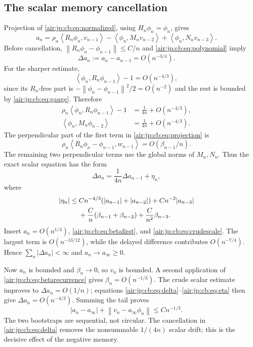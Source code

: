 \documentclass[11pt,letterpaper]{article}
\numberwithin{equation}{section}
\theoremstyle{remark}
\newcommand{\norm}[1]{\left\lVert#1\right\rVert}
\newcommand{\ip}[2]{\left\langle#1,#2\right\rangle}
\begin{document}
\subsection{The scalar memory cancellation}
Projection of \eqref{air:jp:cb:eq:normalized}, using $H_n\phi_n=\phi_n$, gives
\begin{equation}\label{air:jp:cb:eq:projection}
 a_n=\rho_n\ip{R_n\phi_n}{v_{n-1}}
       -\ip{\phi_n}{M_nv_{n-2}}+\ip{\phi_n}{N_nv_{n-3}}.
\end{equation}
Before cancellation, $\norm{R_n\phi_n-\phi_{n-1}}\le C/n$ and \eqref{air:jp:cb:eq:polynomial} imply
\begin{equation}\label{air:jp:cb:eq:crudescale}
 \Delta a_n:=a_n-a_{n-1}=O(n^{-3/4}).
\end{equation}
For the sharper estimate,
\[
 \ip{\phi_n}{R_n\phi_{n-1}}-1=O(n^{-4/3}),
\]
since its $R_n$-free part is $-\norm{\phi_n-\phi_{n-1}}^2/2=O(n^{-2})$ and the rest is bounded by \eqref{air:jp:cb:eq:gauge}. Therefore
\begin{align*}
 \rho_n\ip{\phi_n}{R_n\phi_{n-1}}-1&=\frac1{4n}+O(n^{-4/3}),\\
 \ip{\phi_n}{M_n\phi_{n-2}}&=\frac1{4n}+O(n^{-4/3}).
\end{align*}
The perpendicular part of the first term in \eqref{air:jp:cb:eq:projection} is
\[
 \rho_n\ip{R_n\phi_n-\phi_{n-1}}{w_{n-1}}=O(\beta_{n-1}/n).
\]
The remaining two perpendicular terms use the global norms of $M_n,N_n$. Thus the exact scalar equation has the form
\begin{equation}\label{air:jp:cb:eq:delta}
 \Delta a_n=\frac1{4n}\Delta a_{n-1}+\eta_n,
\end{equation}
where
\begin{align}
 |\eta_n|\le{}&Cn^{-4/3}(|a_{n-1}|+|a_{n-2}|)+Cn^{-2}|a_{n-3}|\notag\\
 &+\frac Cn(\beta_{n-1}+\beta_{n-2})+\frac C{n^2}\beta_{n-3}.\label{air:jp:cb:eq:eta}
\end{align}
Insert $a_n=O(n^{1/4})$, \eqref{air:jp:cb:eq:betafirst}, and \eqref{air:jp:cb:eq:crudescale}. The largest term is $O(n^{-13/12})$, while the delayed difference contributes $O(n^{-7/4})$. Hence $\sum_n|\Delta a_n|<\infty$ and $a_n\to a_\infty\ge0$.

Now $a_n$ is bounded and $\beta_n\to0$, so $v_n$ is bounded. A second application of \eqref{air:jp:cb:eq:betarecurrence} gives $\beta_n=O(n^{-1/3})$. The crude scalar estimate improves to $\Delta a_n=O(1/n)$; equations \eqref{air:jp:cb:eq:delta}--\eqref{air:jp:cb:eq:eta} then give $\Delta a_n=O(n^{-4/3})$. Summing the tail proves
\begin{equation}\label{air:jp:cb:eq:tracking}
 |a_n-a_\infty|+\norm{v_n-a_\infty\phi_n}\le Cn^{-1/3}.
\end{equation}
The two bootstraps are sequential, not circular. The cancellation in \eqref{air:jp:cb:eq:delta} removes the nonsummable $1/(4n)$ scalar drift; this is the decisive effect of the negative memory.
\end{document}
